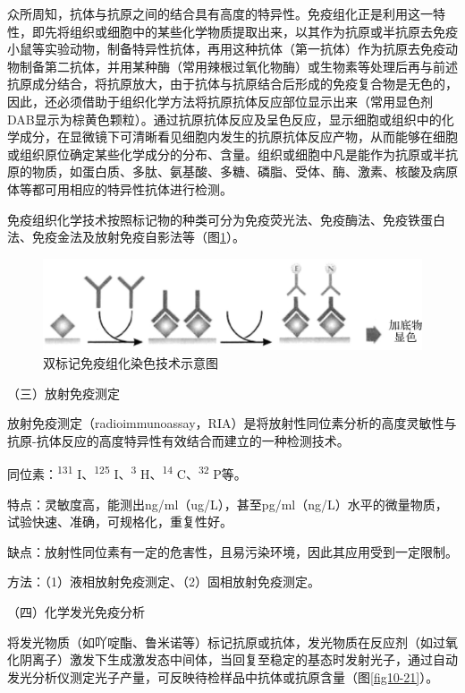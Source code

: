众所周知，抗体与抗原之间的结合具有高度的特异性。免疫组化正是利用这一特性，即先将组织或细胞中的某些化学物质提取出来，以其作为抗原或半抗原去免疫小鼠等实验动物，制备特异性抗体，再用这种抗体（第一抗体）作为抗原去免疫动物制备第二抗体，并用某种酶（常用辣根过氧化物酶）或生物素等处理后再与前述抗原成分结合，将抗原放大，由于抗体与抗原结合后形成的免疫复合物是无色的，因此，还必须借助于组织化学方法将抗原抗体反应部位显示出来（常用显色剂DAB显示为棕黄色颗粒）。通过抗原抗体反应及呈色反应，显示细胞或组织中的化学成分，在显微镜下可清晰看见细胞内发生的抗原抗体反应产物，从而能够在细胞或组织原位确定某些化学成分的分布、含量。组织或细胞中凡是能作为抗原或半抗原的物质，如蛋白质、多肽、氨基酸、多糖、磷脂、受体、酶、激素、核酸及病原体等都可用相应的特异性抗体进行检测。

免疫组织化学技术按照标记物的种类可分为免疫荧光法、免疫酶法、免疫铁蛋白法、免疫金法及放射免疫自影法等（图\ref{fig10-20}）。

\begin{figure}[!htbp]
 \centering
 \includegraphics{./images/Image00174.jpg}
 \captionsetup{justification=centering}
 \caption{双标记免疫组化染色技术示意图}
 \label{fig10-20}
  \end{figure} 

（三）放射免疫测定

放射免疫测定（radioimmunoassay，RIA）是将放射性同位素分析的高度灵敏性与抗原-抗体反应的高度特异性有效结合而建立的一种检测技术。

同位素：\textsuperscript{131} I、\textsuperscript{125}
I、\textsuperscript{3} H、\textsuperscript{14} C、\textsuperscript{32}
P等。

特点：灵敏度高，能测出ng/ml（ug/L），甚至pg/ml（ng/L）水平的微量物质，试验快速、准确，可规格化，重复性好。

缺点：放射性同位素有一定的危害性，且易污染环境，因此其应用受到一定限制。

方法：（1）液相放射免疫测定、（2）固相放射免疫测定。

（四）化学发光免疫分析

将发光物质（如吖啶酯、鲁米诺等）标记抗原或抗体，发光物质在反应剂（如过氧化阴离子）激发下生成激发态中间体，当回复至稳定的基态时发射光子，通过自动发光分析仪测定光子产量，可反映待检样品中抗体或抗原含量（图\ref{fig10-21}）。

